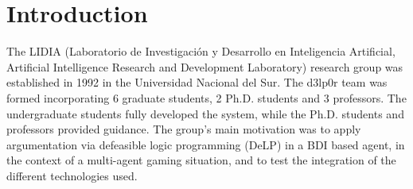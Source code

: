 \documentclass{llncs2e/llncs}
\begin{document}
\begin{comment}
{
    This paper presents the Argonauts multi-agent framework which was developed as 
    part of a one year student project at Technische Universität Dortmund. The 
    Argonauts framework builds on a BDI approach to model rational agents that act 
    cooperatively in a dynamic and indeterministically changing environment. 
    However, our agent model extends the traditional BDI approach in several 
    aspects, most notably by incorporating motivation into the agent’s goal 
    selection mechanism. The framework has been applied by the Argonauts team in 
    the 2010 version of the annual multi-agent programming contest organized by 
    Technische Universität Clausthal. In this paper, we present a high-level 
    specification and analysis of the actual system used for solving the given 
    scenario. We do this by applying the GAIA methodology, a high-level and 
    iterative approach to model communication and roles in multi-agent scenarios. 
    We further describe the technical details and insights gained during our 
    participation in the multi-agent programming contest.     

    In this article we report on the JIAC V team for the agent programming 
    competition 2009, going through the different phases of development and 
    describing the JIAC V agent framework. Based on an iterative approach, we 
    identified and implemented different agent roles. While there is no explicit 
    team concept, the agents cooperate by informing each other of their 
    perceptions and intentions, which leads to emergent team behavior which very 
    dynamically and flexibly reacts to the state of the game. 
}
\end{comment}

\section{Introduction}

    The LIDIA (Laboratorio de Investigación y Desarrollo en Inteligencia 
    Artificial, Artificial Intelligence Research and Development Laboratory) 
    research group was established in 1992 in the Universidad Nacional del Sur. 
    The d3lp0r team was formed incorporating 6 graduate students, 2 Ph.D. students 
    and 3 professors. The undergraduate students fully developed the system, while 
    the Ph.D. students and professors provided guidance. The group's main 
    motivation was to apply argumentation via defeasible logic programming (DeLP) 
    in a BDI based agent, in the context of a multi-agent gaming situation, and to 
    test the integration of the different technologies used.
\end{document}
